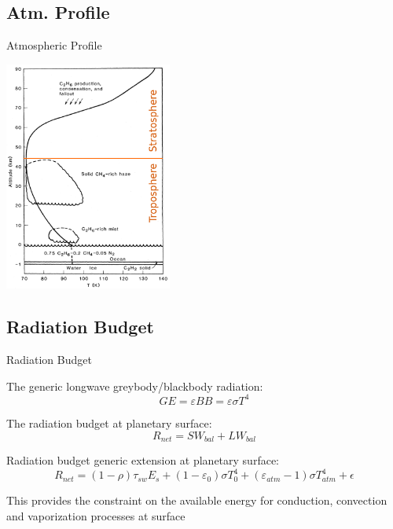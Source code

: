 \documentclass[xcolor=dvipsnames,beamer]{beamer} %
\begin{document}
\subsection{Atm. Profile}
\begin{frame}[fragile]{Atmospheric Profile}

\begin{center}
  \includegraphics[width=5.5cm]{images/1983_Lunine_et_al}
\end{center}
\end{frame}

\subsection{Radiation Budget}
\begin{frame}[fragile]{Radiation Budget}
\begin{block}{The generic longwave greybody/blackbody radiation:}
\begin{equation}
 GE = \varepsilon BB = \varepsilon \sigma T^4
\end{equation}
\end{block}
\begin{block}{The radiation budget at planetary surface:}
\begin{equation}
 R_{net} = SW_{bal} + LW_{bal}
\end{equation}
\end{block}
\begin{block}{Radiation budget generic extension at planetary surface:}
\begin{equation}
 R_{net} =(1-\rho)\tau_{sw} E_s+(1-\varepsilon_0) \sigma T_{0}^4+(\varepsilon_{atm}-1) \sigma T_{atm}^4+\epsilon
\end{equation}
\end{block}
This provides the constraint on the available energy for conduction, convection and vaporization processes at surface
\end{frame}
\end{document}

